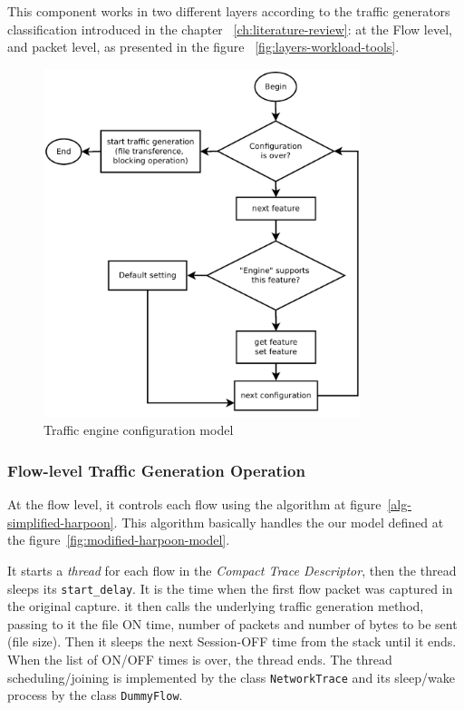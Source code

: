 This component works in two different layers according to the traffic generators classification introduced in the chapter ~\ref{ch:literature-review}: at the Flow level, and packet level, as presented in the figure ~\ref{fig:layers-workload-tools}. 

\begin{figure}[ht!]
    \centering
    \includegraphics[height=4.0in]{figures/ch3/alg-traffic-engine-config}
    \caption{Traffic engine configuration model}
    \label{fig:alg-traffic-engine-config}
\end{figure}

\subsubsection{Flow-level Traffic Generation Operation}

At the flow level, it controls each flow using the algorithm at figure~\ref{alg-simplified-harpoon}. This algorithm basically handles the our model defined at the figure~\ref{fig:modified-harpoon-model}.

It starts a \textit{thread} for each flow in the \textit{Compact Trace Descriptor}, then the thread sleeps its \texttt{start\_delay}. It is the time when the first flow packet was captured in the original capture. it then calls the underlying traffic generation method, passing to it the file ON time, number of packets and number of bytes to be sent (file size). Then it sleeps the next Session-OFF time from the stack until it ends. When the list of ON/OFF times is over, the thread ends. The thread scheduling/joining is implemented by the class \texttt{NetworkTrace} and its sleep/wake process by the class \texttt{DummyFlow}.


